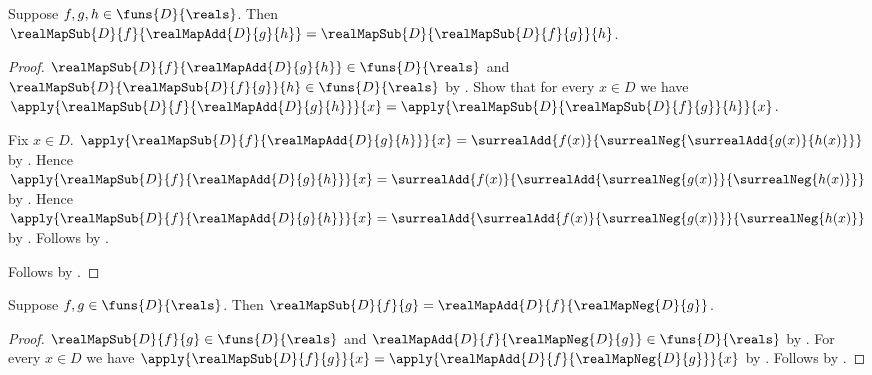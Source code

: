 \begin{proposition}\label{real_map_sub_add_right}
    Suppose $f,g,h\in\funs{D}{\reals}$.
    Then
        $\realMapSub{D}{f}{\realMapAdd{D}{g}{h}}=
            \realMapSub{D}{\realMapSub{D}{f}{g}}{h}$.
\end{proposition}
\begin{proof}
    $\realMapSub{D}{f}{\realMapAdd{D}{g}{h}}\in\funs{D}{\reals}$ and
        $\realMapSub{D}{\realMapSub{D}{f}{g}}{h}\in\funs{D}{\reals}$
        by .
    Show that for every $x\in D$ we have
        $\apply{\realMapSub{D}{f}{\realMapAdd{D}{g}{h}}}{x}
            =\apply{\realMapSub{D}{\realMapSub{D}{f}{g}}{h}}{x}$.
    \begin{subproof}
        Fix $x\in D$.
        $\apply{\realMapSub{D}{f}{\realMapAdd{D}{g}{h}}}{x}
            =\surrealAdd{f(x)}
                {\surrealNeg{\surrealAdd{g(x)}{h(x)}}}$
            by
            .
        Hence
            $\apply{\realMapSub{D}{f}{\realMapAdd{D}{g}{h}}}{x}
                =\surrealAdd{f(x)}
                    {\surrealAdd{\surrealNeg{g(x)}}
                        {\surrealNeg{h(x)}}}$
            by
            .
        Hence
            $\apply{\realMapSub{D}{f}{\realMapAdd{D}{g}{h}}}{x}
                =\surrealAdd{
                    \surrealAdd{f(x)}{\surrealNeg{g(x)}}}
                    {\surrealNeg{h(x)}}$
            by
            .
        Follows by
            .
    \end{subproof}
    Follows by .
\end{proof}

\begin{proposition}\label{real_map_sub_eq_add_neg}
    Suppose $f,g\in\funs{D}{\reals}$.
    Then
        $\realMapSub{D}{f}{g}=
            \realMapAdd{D}{f}{\realMapNeg{D}{g}}$.
\end{proposition}
\begin{proof}
    $\realMapSub{D}{f}{g}\in\funs{D}{\reals}$ and
        $\realMapAdd{D}{f}{\realMapNeg{D}{g}}\in\funs{D}{\reals}$
        by .
    For every $x\in D$ we have
        $\apply{\realMapSub{D}{f}{g}}{x}=
            \apply{\realMapAdd{D}{f}{\realMapNeg{D}{g}}}{x}$
        by
        .
    Follows by .
\end{proof}

